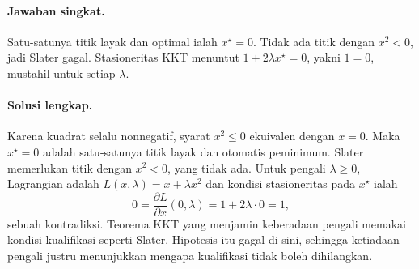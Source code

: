 \paragraph{Jawaban singkat.}
\label{orig03:midterm:answer:0006}
Satu-satunya titik layak dan optimal ialah $x^\star=0$. Tidak ada titik dengan
$x^2<0$, jadi Slater gagal. Stasioneritas KKT menuntut
$1+2\lambda x^\star=0$, yakni $1=0$, mustahil untuk setiap $\lambda$.

\paragraph{Solusi lengkap.}
\label{orig03:midterm:solution:0006}
Karena kuadrat selalu nonnegatif, syarat $x^2\le0$ ekuivalen dengan $x=0$.
Maka $x^\star=0$ adalah satu-satunya titik layak dan otomatis peminimum.
Slater memerlukan titik dengan $x^2<0$, yang tidak ada. Untuk pengali
$\lambda\ge0$, Lagrangian adalah $L(x,\lambda)=x+\lambda x^2$ dan kondisi
stasioneritas pada $x^\star$ ialah
\[
 0=\frac{\partial L}{\partial x}(0,\lambda)=1+2\lambda\cdot0=1,
\]
sebuah kontradiksi. Teorema KKT yang menjamin keberadaan pengali memakai
kondisi kualifikasi seperti Slater. Hipotesis itu gagal di sini, sehingga
ketiadaan pengali justru menunjukkan mengapa kualifikasi tidak boleh
dihilangkan.
